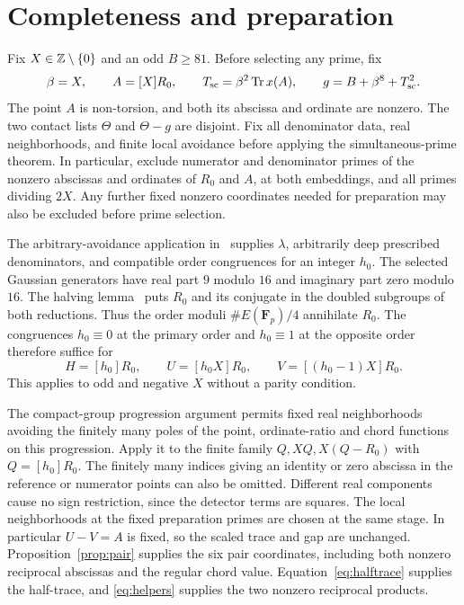 \documentclass[11pt,a4paper]{article}
\DeclareMathOperator{\Tr}{Tr}\DeclareMathOperator{\Nm}{Nm}
\begin{document}
\section{Completeness and preparation}\label{sec:completeness}
Fix $X\in\mathbb Z\setminus\{0\}$ and an odd $B\ge81$. Before selecting
any prime, fix
\[
 \beta=X,\qquad A=[X]R_0,\qquad
 T_{\rm sc}=\beta^2\Tr x(A),\qquad g=B+\beta^8+T_{\rm sc}^2.
\]
The point $A$ is non-torsion, and both its abscissa and ordinate
are nonzero. The two contact lists $\Theta$ and $\Theta-g$ are
disjoint. Fix all denominator data, real neighborhoods, and finite
local avoidance before applying the simultaneous-prime theorem.
In particular, exclude numerator and denominator primes of the
nonzero abscissas and ordinates of $R_0$ and $A$, at both embeddings,
and all primes dividing $2X$. Any further fixed nonzero coordinates
needed for preparation may also be excluded before prime selection.

The arbitrary-avoidance application in~\cite[Section~2]{Primes}
supplies $\lambda$, arbitrarily deep prescribed denominators, and
compatible order congruences for an integer $h_0$. The selected
Gaussian generators have real part $9$ modulo $16$ and imaginary
part zero modulo $16$. The halving lemma~\cite[Section~5]{Half}
puts $R_0$ and its conjugate in the doubled subgroups of both
reductions. Thus the order moduli $\#E(\mathbf F_p)/4$ annihilate
$R_0$. The congruences $h_0\equiv0$ at the primary order and
$h_0\equiv1$ at the opposite order therefore suffice for
\[
 H=[h_0]R_0,\qquad U=[h_0X]R_0,\qquad V=[(h_0-1)X]R_0.
\]
This applies to odd and negative $X$ without a parity condition.

The compact-group progression argument permits fixed real
neighborhoods avoiding the finitely many poles of the point,
ordinate-ratio and chord functions on this progression. Apply it
to the finite family $Q,XQ,X(Q-R_0)$ with $Q=[h_0]R_0$.
The finitely many indices giving an identity or zero abscissa in
the reference or numerator points can also be omitted. Different
real components cause no sign restriction, since the detector
terms are squares. The local neighborhoods at the fixed
preparation primes are chosen at the same stage. In particular
$U-V=A$ is fixed, so the scaled trace and gap are unchanged.
Proposition~\ref{prop:pair} supplies the six pair coordinates,
including both nonzero reciprocal abscissas and the regular chord
value. Equation~\eqref{eq:halftrace} supplies the half-trace, and
\eqref{eq:helpers} supplies the two nonzero reciprocal products.
\end{document}
